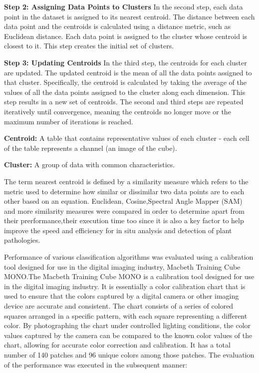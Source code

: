 \documentclass{article}
\begin{document}
{                    \textbf{Step 2: Assigning Data Points to Clusters}
                    In the second step, each data point in the dataset is assigned to its nearest centroid. The distance between each data point and the centroids is calculated using a distance metric, such as Euclidean distance. Each data point is assigned to the cluster whose centroid is closest to it. This step creates the initial set of clusters.\par

                    \textbf{Step 3: Updating Centroids}
                    In the third step, the centroids for each cluster are updated. The updated centroid is the mean of all the data points assigned to that cluster. Specifically, the centroid is calculated by taking the average of the values of all the data points assigned to the cluster along each dimension. This step results in a new set of centroids. The second and third steps are repeated iteratively until convergence, meaning the centroids no longer move or the maximum number of iterations is reached.\par
                    
                    \textbf{Centroid:} A table that contains representative values of each cluster - each cell of the table represents a channel (an image of the cube).

                    \textbf{Cluster:}   A group of data with common characteristics.
                    
                    The term nearest centroid is defined by a similarity measure which refers to the metric used to determine how similar or dissimilar two data points are to each other based on an equation. Euclidean, Cosine,Spectral Angle Mapper (SAM) and more similarity measures were compared in order to determine apart from their prerformance,their execution time too since it is also a key factor to help improve the speed and efficiency for in situ analysis and detection of plant pathologies.\par
                    Performance of various classification algorithms was evaluated using a calibration tool designed for use in the digital imaging industry, Macbeth Training Cube MONO.The Macbeth Training Cube MONO is a calibration tool designed for use in the digital imaging industry. It is essentially a color calibration chart that is used to ensure that the colors captured by a digital camera or other imaging device are accurate and consistent. The chart consists of a series of colored squares arranged in a specific pattern, with each square representing a different color. By photographing the chart under controlled lighting conditions, the color values captured by the camera can be compared to the known color values of the chart, allowing for accurate color correction and calibration. It has a total number of 140 patches and 96 unique colors among those patches. The evaluation of the performance was executed in the subsequent manner:
                    
}
\end{document}

